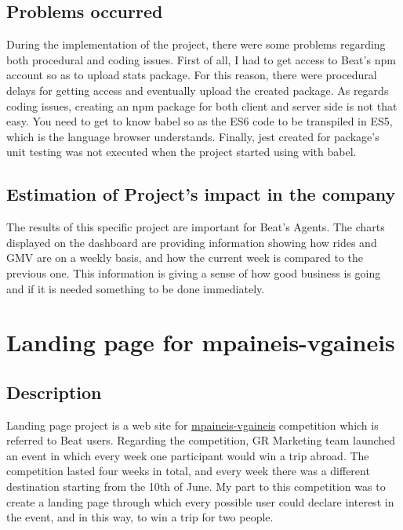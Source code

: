 \subsection{Problems occurred}

During the implementation of the project, there were some problems regarding both procedural and coding issues. First of all, I had to get access to Beat's npm account so as to upload stats package. For this reason, there were procedural delays for getting access and eventually upload the created package. As regards coding issues, creating an npm package for both client and server side is not that easy. You need to get to know babel so as the ES6 code to be transpiled in ES5, which is the language browser understands. Finally, jest created for package's unit testing was not executed when the project started using with babel. \par

\subsection{Estimation of Project's impact in the company}

The results of this specific project are important for Beat's Agents. The charts displayed on the dashboard are providing information showing how rides and GMV are on a weekly basis, and how the current week is compared to the previous one. This information is giving a sense of how good business is going and if it is needed something to be done immediately.

\section{Landing page for mpaineis-vgaineis}

\subsection{Description}

Landing page project is a web site for \href{mpaineis-vgaineis.gr}{mpaineis-vgaineis} competition which is referred to Beat users. Regarding the competition, GR Marketing team launched an event in which every week one participant would win a trip abroad. The competition lasted four weeks in total, and every week there was a different destination starting from the 10th of June. My part to this competition was to create a landing page through which every possible user could declare interest in the event, and in this way, to win a trip for two people. \par

